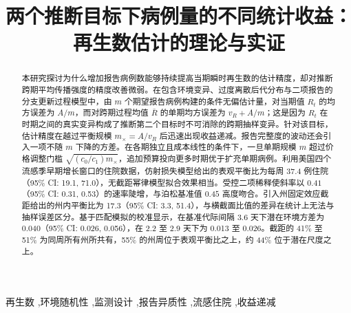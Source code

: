 \documentclass[authoryear,preprint,10pt,fleqn]{elsarticle}
\theoremstyle{remark}
\newcommand{\mx}{m_{\times}}
\begin{document}
\begin{frontmatter}

\title{两个推断目标下病例量的不同统计收益：\\再生数估计的理论与实证}


\begin{abstract}
\noindent 本研究探讨为什么增加报告病例数能够持续提高当期瞬时再生数的估计精度，却对推断跨期平均传播强度的精度改善微弱。在包含环境变异、过度离散后代分布与二项报告的分支更新过程模型中，由 $m$ 个期望报告病例构建的条件无偏估计量，对当期值 $R_t$ 的均方误差为 $A/m$，而对跨期过程均值 $\bar{R}$ 的单期均方误差为 $v_R+A/m$；这是因为 $R_t$ 在时期之间的真实变异构成了推断第二个目标时不可消除的跨期抽样变异。针对该目标，估计精度在越过平衡规模 $\mx=A/v_R$ 后迅速出现收益递减。报告完整度的波动还会引入一项不随 $m$ 下降的方差。在各期独立且成本线性的条件下，一旦单期规模 $m$ 超过价格调整门槛 $\sqrt{(c_0/c_1)\mx}$，追加预算投向更多时期优于扩充单期病例。利用美国四个流感季早期增长窗口的住院数据，仿射损失模型给出的表观平衡比为每周 37.4 例住院（95\% CI: 19.1, 71.0），无截距幂律模型拟合效果相当。受控二项稀释使斜率以 $0.41$（95\% CI: 0.31, 0.53）的速率陡增，与泊松基准值 $0.45$ 高度吻合。引入州固定效应截距给出的州内平衡比为 17.3（95\% CI: 3.3, 51.4），与横截面比值的差异在统计上无法与抽样误差区分。基于匹配模拟的校准显示，在基准代际间隔 3.6 天下潜在环境方差为 0.040（95\% CI: 0.026, 0.056），在 2.2 至 2.9 天下为 0.013 至 0.026。截距的 41\% 至 51\% 为同周所有州所共有，55\% 的州周位于表观平衡比之上，约 44\% 位于潜在尺度之上。
\end{abstract}

\begin{keyword}
再生数 \sep 环境随机性 \sep 监测设计 \sep 报告异质性 \sep 流感住院 \sep 收益递减
\end{keyword}

\end{frontmatter}









\FloatBarrier
\clearpage



\FloatBarrier
\clearpage

\end{document}
